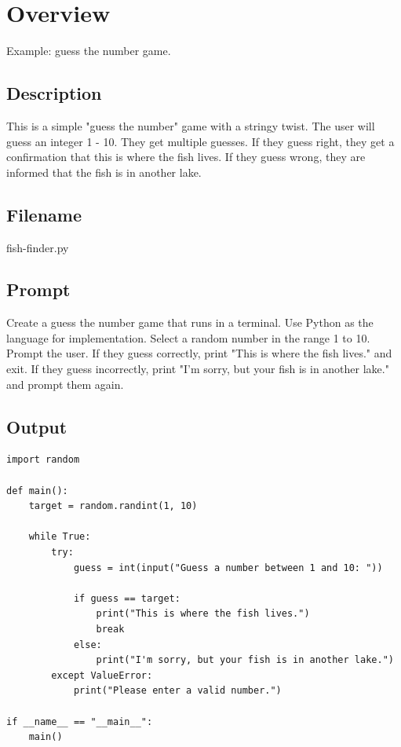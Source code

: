 \documentclass{article}
\begin{document}
\section*{Overview}
Example: guess the number game.

\subsection*{Description}
This is a simple "guess the number" game with a stringy twist. The user will guess an integer 1 - 10. They get multiple guesses. If they guess right, they get a confirmation that this is where the fish lives. If they guess wrong, they are informed that the fish is in another lake.

\subsection*{Filename}
fish-finder.py

\subsection*{Prompt}
Create a guess the number game that runs in a terminal. Use Python as the language for implementation. Select a random number in the range 1 to 10. Prompt the user. If they guess correctly, print "This is where the fish lives." and exit. If they guess incorrectly, print "I'm sorry, but your fish is in another lake." and prompt them again.

\subsection*{Output}
\begin{verbatim}
import random

def main():
    target = random.randint(1, 10)

    while True:
        try:
            guess = int(input("Guess a number between 1 and 10: "))

            if guess == target:
                print("This is where the fish lives.")
                break
            else:
                print("I'm sorry, but your fish is in another lake.")
        except ValueError:
            print("Please enter a valid number.")

if __name__ == "__main__":
    main()
\end{verbatim}
\end{document}
